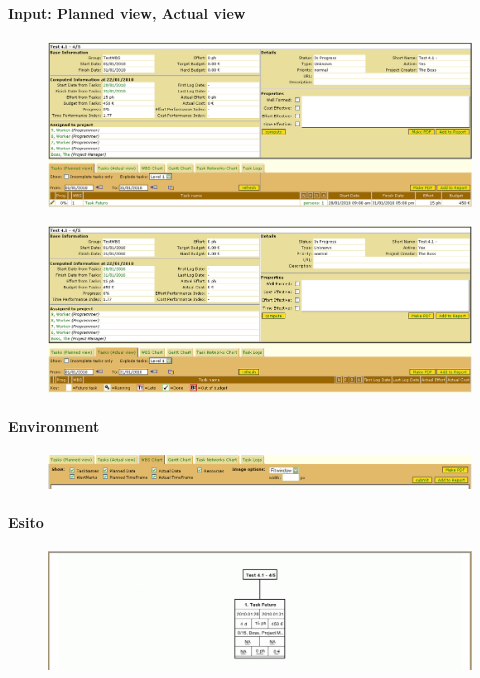 \paragraph{Input: Planned view, Actual view}
\begin{figure}
\centering
\includegraphics[width=\textwidth]{tests/TEST_WBS/4.1/4.1_4_5/Esempio_2/input.png}
\end{figure}
\begin{figure}
\centering
\includegraphics[width=\textwidth]{tests/TEST_WBS/4.1/4.1_4_5/Esempio_2/input_actual.png}
\end{figure}
\newpage

\paragraph{Environment}
\begin{figure}
\centering
\includegraphics[width=\textwidth]{tests/TEST_WBS/4.1/4.1_4_5/Esempio_2/environment.png}
\end{figure}
\paragraph{Esito}
\begin{figure}
\centering
\includegraphics[width=\textwidth]{tests/TEST_WBS/4.1/4.1_4_5/Esempio_2/output.png}
\end{figure}
\newpage